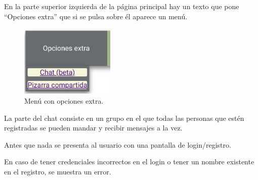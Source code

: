 \documentclass{article}
\begin{document}
En la parte superior izquierda de la página principal hay un texto que pone ``Opciones extra'' que si se pulsa sobre él aparece un menú.

\begin{figure}[H]
    \centering
    \includegraphics[width=0.4\textwidth]{images/extra.png}
    \caption{Menú con opciones extra.}
\end{figure}

La parte del chat consiste en un grupo en el que todas las personas que estén registradas se pueden mandar y recibir mensajes a la vez.

Antes que nada se presenta al usuario con una pantalla de login/registro.

En caso de tener credenciales incorrectos en el login o tener un nombre existente en el registro, se muestra un error.
\end{document}
